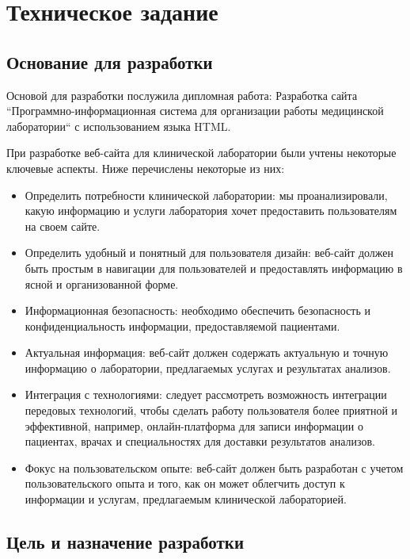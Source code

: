 \newsection
\setcounter{figure}{0}\setcounter{table}{0}
\section{Техническое задание}
\subsection{Основание для разработки}

Основой для разработки послужила дипломная работа:
Разработка сайта ``Программно-информационная система для организации работы медицинской лаборатории`` с использованием языка HTML.

При разработке веб-сайта для клинической лаборатории были учтены некоторые ключевые аспекты. Ниже перечислены некоторые из них:

\begin{itemize}
	\item Определить потребности клинической лаборатории: мы проанализировали, какую информацию и услуги лаборатория хочет предоставить пользователям на своем сайте.
	\item Определить удобный и понятный для пользователя дизайн: веб-сайт должен быть простым в навигации для пользователей и предоставлять информацию в ясной и организованной форме.
	\item Информационная безопасность: необходимо обеспечить безопасность и конфиденциальность информации, предоставляемой пациентами.
	\item Актуальная информация: веб-сайт должен содержать актуальную и точную информацию о лаборатории, предлагаемых услугах и результатах анализов.
	\item Интеграция с технологиями: следует рассмотреть возможность интеграции передовых технологий, чтобы сделать работу пользователя более приятной и эффективной, например, онлайн-платформа для записи информации о пациентах, врачах и специальностях для доставки результатов анализов.
	\item Фокус на пользовательском опыте: веб-сайт должен быть разработан с учетом пользовательского опыта и того, как он может облегчить доступ к информации и услугам, предлагаемым клинической лабораторией.
\end{itemize}

\subsection{Цель и назначение разработки}

